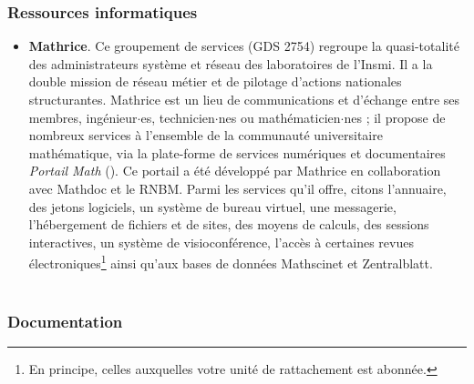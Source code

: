 \subsubsection{Ressources informatiques}
\begin{itemize}
\item{\bf Mathrice}.
Ce groupement de services (GDS 2754) 
regroupe la quasi-totalit\'e des administrateurs syst\`eme et r\'eseau des laboratoires de l'Insmi. Il a la double mission de r\'eseau m\'etier et de pilotage d'actions nationales structurantes. Mathrice est un lieu de communications et d'\'echange entre ses membres, ing\'enieur$\cdot$es, technicien$\cdot$nes ou math\'ematicien$\cdot$nes ; il propose de nombreux services \`a l'ensemble de la communaut\'e universitaire math\'ematique, via la plate-forme de services num\'eriques et documentaires {\it Portail Math} (). Ce portail a \'et\'e d\'evelopp\'e par Mathrice en collaboration avec Mathdoc et le RNBM. Parmi les services qu'il offre, citons l'annuaire, des jetons logiciels, un syst\`eme de bureau virtuel, une messagerie, l'h\'ebergement de fichiers et de sites, des moyens de calculs, des sessions interactives, un syst\`eme de visioconf\'erence,
l'acc\`es \`a certaines
revues \'electroniques\footnote{En principe, celles auxquelles votre unit\'e de rattachement est abonn\'ee.}
 ainsi qu'aux bases de donn\'ees Mathscinet et Zentralblatt. \\
\\

\end{itemize}




\subsubsection{Documentation}

